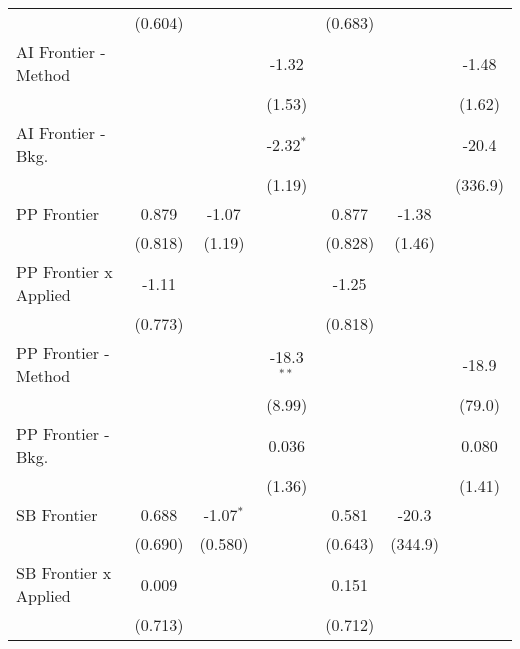 \begin{tabular}{lcccccc}
                                & (0.604)       &              &              & (0.683)       &              &   \\   
   AI Frontier - Method         &               &              & -1.32        &               &              & -1.48\\   
                                &               &              & (1.53)       &               &              & (1.62)\\   
   AI Frontier - Bkg.           &               &              & -2.32$^{*}$  &               &              & -20.4\\   
                                &               &              & (1.19)       &               &              & (336.9)\\   
   PP Frontier                  & 0.879         & -1.07        &              & 0.877         & -1.38        &   \\   
                                & (0.818)       & (1.19)       &              & (0.828)       & (1.46)       &   \\   
   PP Frontier x Applied        & -1.11         &              &              & -1.25         &              &   \\   
                                & (0.773)       &              &              & (0.818)       &              &   \\   
   PP Frontier - Method         &               &              & -18.3$^{**}$ &               &              & -18.9\\   
                                &               &              & (8.99)       &               &              & (79.0)\\   
   PP Frontier - Bkg.           &               &              & 0.036        &               &              & 0.080\\   
                                &               &              & (1.36)       &               &              & (1.41)\\   
   SB Frontier                  & 0.688         & -1.07$^{*}$  &              & 0.581         & -20.3        &   \\   
                                & (0.690)       & (0.580)      &              & (0.643)       & (344.9)      &   \\   
   SB Frontier x Applied        & 0.009         &              &              & 0.151         &              &   \\   
                                & (0.713)       &              &              & (0.712)       &              &   \\   

\end{tabular}
